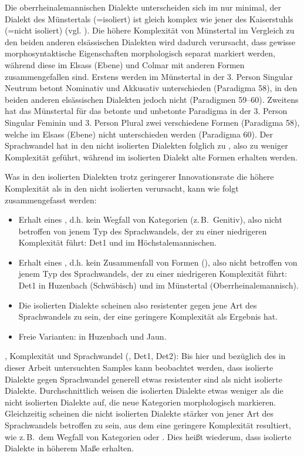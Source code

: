 Die oberrheinalemannischen Dialekte unterscheiden sich im  nur minimal, der Dialekt des Münstertals (=isoliert) ist gleich komplex wie jener des Kaiserstuhls (=nicht isoliert) (vgl. ). Die höhere Komplexität von Münstertal im Vergleich zu den beiden anderen elsässischen Dialekten wird dadurch verursacht, dass gewisse morphosyntaktische Eigenschaften morphologisch separat markiert werden, während diese im Elsass (Ebene) und Colmar mit anderen Formen zusammengefallen sind. Erstens werden im Münstertal in der 3. Person Singular Neutrum betont Nominativ und Akkusativ unterschieden (Paradigma 58), in den beiden anderen elsässischen Dialekten jedoch nicht (Paradigmen 59–60). Zweitens hat das Münstertal für das betonte und unbetonte Paradigma in der 3. Person Singular Feminin und 3. Person Plural zwei verschiedene Formen (Paradigma 58), welche im Elsass (Ebene) nicht unterschieden werden (Paradigma 60). Der Sprachwandel hat in den nicht isolierten Dialekten folglich zu , also zu weniger Komplexität geführt, während im isolierten Dialekt alte Formen erhalten werden.

Was in den isolierten Dialekten trotz geringerer Innovationsrate die höhere Komplexität als in den nicht isolierten verursacht, kann wie folgt zusammengefasst werden:

\begin{itemize}
\item
Erhalt eines , d.h. kein Wegfall von Kategorien (z.\,B.\ Genitiv), also nicht betroffen von jenem Typ des Sprachwandels, der zu einer niedrigeren Komplexität führt: Det1 und  im Höchstalemannischen.
\item
Erhalt eines , d.h. kein Zusammenfall von Formen (), also nicht betroffen von jenem Typ des Sprachwandels, der zu einer niedrigeren Komplexität führt: Det1 in Huzenbach (Schwäbisch) und  im Münstertal (Oberrheinalemannisch).
\item
Die isolierten Dialekte scheinen also resistenter gegen jene Art des Sprachwandels zu sein, der eine geringere Komplexität als Ergebnis hat.
\item
Freie Varianten:  in Huzenbach und Jaun.
\end{itemize}

{, Komplexität und Sprachwandel (, Det1, Det2):} Bis hier und bezüglich des in dieser Arbeit untersuchten Samples kann beobachtet werden, dass isolierte Dialekte gegen Sprachwandel generell etwas resistenter sind als nicht isolierte Dialekte. Durchschnittlich weisen die isolierten Dialekte etwas weniger  als die nicht isolierten Dialekte auf, die neue Kategorien morphologisch markieren. Gleichzeitig scheinen die nicht isolierten Dialekte stärker von jener Art des Sprachwandels betroffen zu sein, aus dem eine geringere Komplexität resultiert, wie z.\,B.\ dem Wegfall von Kategorien oder . Dies heißt wiederum, dass isolierte Dialekte  in höherem Maße erhalten.

